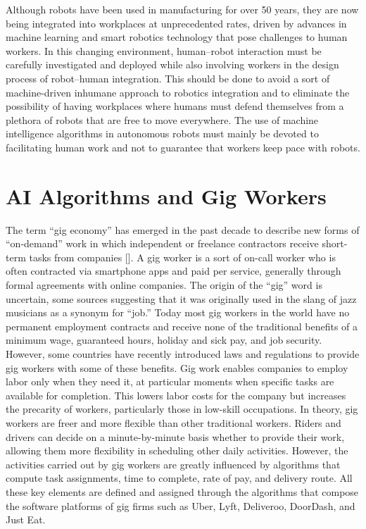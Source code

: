 Although robots have been used in manufacturing for over 50 years, they are now being integrated into workplaces at unprecedented rates, driven by advances in machine learning and smart robotics technology that pose challenges to human workers. In this changing environment, human--robot interaction must be carefully investigated and deployed while also involving workers in the design process of robot--human integration. This should be done to avoid a sort of machine-driven inhumane approach to robotics integration and to eliminate the possibility of having workplaces where humans must defend themselves from a plethora of robots that are free to move everywhere. The use of machine intelligence algorithms in autonomous robots must mainly be devoted to facilitating human work and not to guarantee that workers keep pace with robots.


\section{\label{sec:6.4}AI Algorithms and Gig Workers}

The term ``gig economy'' has emerged in the past decade to describe new forms of ``on-demand'' work in which independent or freelance contractors receive short-term tasks from companies [\citealt{chap:6:Schor:2020}]. A gig worker is a\vadjust{\vspace*{10pt}\pagebreak} sort of on-call worker who is often contracted via smartphone apps and paid per service, generally through formal agreements with online companies. The origin of the ``gig'' word is uncertain, some sources suggesting that it was originally used in the slang of jazz musicians as a synonym for ``job.'' Today most gig workers in the world have no permanent employment contracts and receive none of the traditional benefits of a minimum wage, guaranteed hours, holiday and sick pay, and job security. However, some countries have recently introduced laws and regulations to provide gig workers with some of these benefits. Gig work enables companies to employ labor only when they need it, at particular moments when specific tasks are available for completion. This lowers labor costs for the company but increases the precarity of workers, particularly those in low-skill occupations. In theory, gig workers are freer and more flexible than other traditional workers. Riders and drivers can decide on a minute-by-minute basis whether to provide their work, allowing them more flexibility in scheduling other daily activities. However, the activities carried out by gig workers are greatly influenced by algorithms that compute task assignments, time to complete, rate of pay, and delivery route. All these key elements are defined and assigned through the algorithms that compose the software platforms of gig firms such as Uber, Lyft, Deliveroo, DoorDash, and Just Eat.

